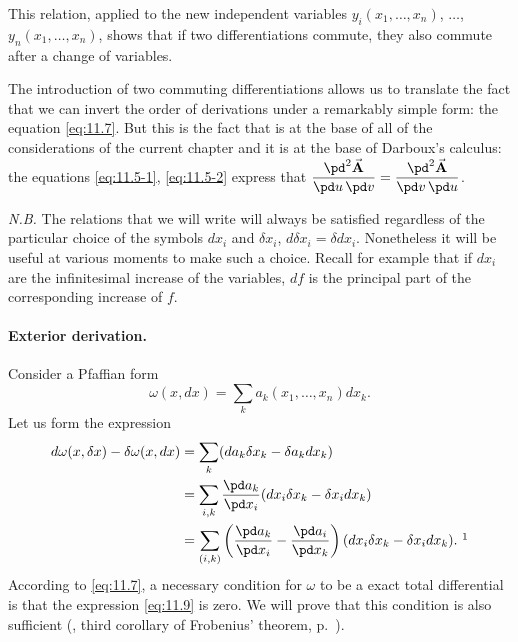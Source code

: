 This relation, applied to the new independent variables $y_{i}(x_{1},\dots,x_{n})$, $\dots$, $y_{n}(x_{1},\dots,x_{n})$, shows that if two differentiations commute, they also commute after a change of variables.

The introduction of two commuting differentiations allows us to translate the fact that we can invert the order of derivations under a remarkably simple form: the equation \eqref{eq:11.7}. But this is the fact that is at the base of all of the considerations of the current chapter and it is at the base of Darboux's calculus: the equations \eqref{eq:11.5-1}, \eqref{eq:11.5-2} express that $\dfrac{\pd^{2}\vec{\mathbf{A}}}{\pd u\,\pd v}=\dfrac{\pd^{2}\vec{\mathbf{A}}}{\pd v\,\pd u}$.

\somespace

\emph{N.B.} The relations that we will write will always be satisfied regardless of the particular choice of the symbols $dx_{i}$ and $\delta x_{i}$, $d\delta x_{i}=\delta dx_{i}$. Nonetheless it will be useful at various moments to make such a choice. Recall for example that if $dx_{i}$ are the infinitesimal increase of the variables, $df$ is the principal part of the corresponding increase of $f$.

\paragraph{Exterior derivation.}
\label{sec:155}
Consider a Pfaffian form
\begin{equation}
  \label{eq:11.8}
  \omega(x,dx)=\sum_{k}a_{k}(x_{1},\dots,x_{n})dx_{k}.
\end{equation}
Let us form the expression
\begin{align}
  \label{eq:11.9}
  d\omega(x,\delta x)-\delta\omega(x,dx)&=\sum_{k}(da_{k}\delta x_{k}-\delta a_{k}dx_{k})\\
  &=\sum_{i,k}\frac{\pd a_{k}}{\pd x_{i}}(dx_{i}\delta x_{k}-\delta x_{i}dx_{k})\notag\\
  &=\sum_{(i,k)}\left(\frac{\pd a_{k}}{\pd x_{i}}-\frac{\pd a_{i}}{\pd x_{k}}\right)(dx_{i}\delta x_{k}-\delta x_{i}dx_{k}).\ \footnotemark\notag
\end{align}
According to \eqref{eq:11.7}, a necessary condition for $\omega$ to be a exact total differential is that the expression \eqref{eq:11.9} is zero. We will prove that this condition is also sufficient (, third corollary of Frobenius' theorem, p.~\pageref{sec:166}).

